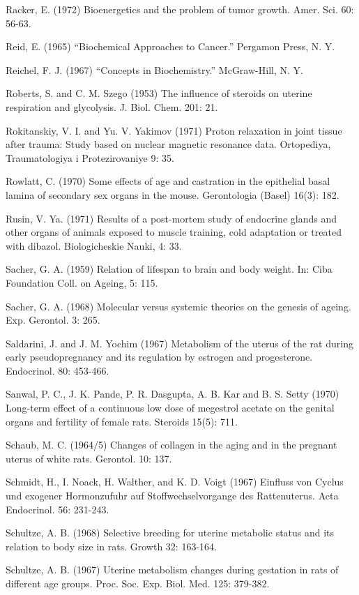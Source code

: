 Racker, E. (1972) Bioenergetics and the problem of tumor growth. Amer. Sci. 60: 56-63.

Reid, E. (1965) ``Biochemical Approaches to Cancer.'' Pergamon Press, N. Y.

Reichel, F. J. (1967) ``Concepts in Biochemistry.'' McGraw-Hill, N. Y.

Roberts, S. and C. M. Szego (1953) The influence of steroids on uterine respiration and glycolysis. J. Biol. Chem. 201: 21.

Rokitanskiy, V. I. and Yu. V. Yakimov (1971) Proton relaxation in joint tissue after trauma: Study based on nuclear magnetic resonance data. Ortopediya, Traumatologiya i Protezirovaniye 9: 35.

Rowlatt, C. (1970) Some effects of age and castration in the epithelial basal lamina of secondary sex organs in the mouse. Gerontologia (Basel) 16(3): 182.

Rusin, V. Ya. (1971) Results of a post-mortem study of endocrine glands and other organs of animals exposed to muscle training, cold adaptation or treated with dibazol. Biologicheskie Nauki, 4: 33.

Sacher, G. A. (1959) Relation of lifespan to brain and body weight. In: Ciba Foundation Coll. on Ageing, 5: 115.

Sacher, G. A. (1968) Molecular versus systemic theories on the genesis of ageing. Exp. Gerontol. 3: 265.

Saldarini, J. and J. M. Yochim (1967) Metabolism of the uterus of the rat during early pseudopregnancy and its regulation by estrogen and progesterone. Endocrinol. 80: 453-466.

Sanwal, P. C., J. K. Pande, P. R. Dasgupta, A. B. Kar and B. S. Setty (1970) Long-term effect of a continuous low dose of megestrol acetate on the genital organs and fertility of female rats. Steroids 15(5): 711.

Schaub, M. C. (1964/5) Changes of collagen in the aging and in the pregnant uterus of white rats. Gerontol. 10: 137.

Schmidt, H., I. Noack, H. Walther, and K. D. Voigt (1967) Einfluss von Cyclus und exogener Hormonzufuhr auf Stoffwechselvorgange des Rattenuterus. Acta Endocrinol. 56: 231-243.

Schultze, A. B. (1968) Selective breeding for uterine metabolic status and its relation to body size in rats. Growth 32: 163-164.

Schultze, A. B. (1967) Uterine metabolism changes during gestation in rats of different age groups. Proc. Soc. Exp. Biol. Med. 125: 379-382.

